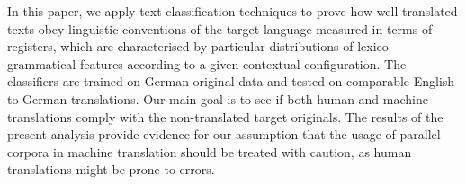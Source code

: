 In this paper, we apply text classification techniques to prove how well translated texts obey linguistic conventions of the target language measured in terms of registers, which are characterised by particular distributions of lexico-grammatical features according to a given contextual configuration. The classifiers are trained on German original data and tested on comparable English-to-German translations. Our main goal is to see if both human and machine translations comply with the non-translated target originals. The results of the present analysis provide evidence for our assumption that the usage of parallel corpora in machine translation should be treated with caution, as human translations might be prone to errors.
